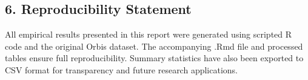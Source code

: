 \documentclass[
  12pt,
]{article}
\begin{document}
\subsection{6. Reproducibility
Statement}\label{reproducibility-statement}

All empirical results presented in this report were generated using
scripted R code and the original Orbis dataset. The accompanying .Rmd
file and processed tables ensure full reproducibility. Summary
statistics have also been exported to CSV format for transparency and
future research applications.
\end{document}
